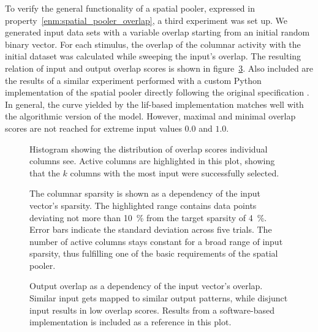 To verify the general functionality of a spatial pooler, expressed in property~\ref{enm:spatial_pooler_overlap}, a third experiment was set up. We generated input data sets with a variable overlap starting from an initial random binary vector. For each stimulus, the overlap of the columnar activity with the initial dataset was calculated while sweeping the input's overlap. The resulting relation of input and output overlap scores is shown in figure~\ref{fig:spatial_pooler_overlap}. Also included are the results of a similar experiment performed with a custom Python implementation of the spatial pooler directly following the original specification \citep{numenta2011htm}. In general, the curve yielded by the \gls{lif}-based implementation matches well with the algorithmic version of the model. However, maximal and minimal overlap scores are not reached for extreme input values $0.0$ and $1.0$.

\begin{figure}
	\begin{center}
		
	\end{center}
	\caption{Histogram showing the distribution of overlap scores individual columns see. Active columns are highlighted in this plot, showing that the $k$ columns with the most input were successfully selected.} 
	\label{fig:spatial_pooler_activity}
\end{figure}

\begin{figure}
	\begin{center}
		
	\end{center}
	\caption{The columnar sparsity is shown as a dependency of the input vector's sparsity. The highlighted range contains data points deviating not more than \SI{10}{\%} from the target sparsity of \SI{4}{\%}. Error bars indicate the standard deviation across five trials. The number of active columns stays constant for a broad range of input sparsity, thus fulfilling one of the basic requirements of the spatial pooler.} 
	\label{fig:spatial_pooler_sparsity}
\end{figure}

\begin{figure}
	\begin{center}
		
	\end{center}
	\caption{Output overlap as a dependency of the input vector's overlap. Similar input gets mapped to similar output patterns, while disjunct input results in low overlap scores. Results from a software-based implementation is included as a reference in this plot.}
	\label{fig:spatial_pooler_overlap}
\end{figure}

